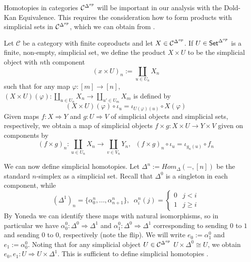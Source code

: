 Homotopies in categories $\mathcal{C}^{\Delta^{op}}$ will be important in our analysis with the Dold-Kan Equivalence. This requires the consideration how to form products with simplicial sets in $\mathcal{C}^{\Delta^{op}}$, which we can obtain from \cite[Defn 14.13.1]{StacksProject}.

\begin{defn}
    Let $\mathcal{C}$ be a category with finite coproducts and let $X \in \mathcal{C}^{\Delta^{op}}$. If $U \in \textup{\textsf{Set}}^{\Delta^{op}}$ is a finite, non-empty, simplicial set, we define the product $X \times U$ to be the simplicial object with $n$th component
    \begin{equation*}
        (x\times U)_n := \coprod_{u \in U_n}X_n
    \end{equation*}
    such that for any map $\varphi:[m]\rightarrow [n]$, $(X\times U)(\varphi):\coprod_{u \in U_n}X_n\rightarrow \coprod_{u' \in U_m}X_m$ is defined by
    \begin{equation*}
        (X\times U)(\varphi)\circ \iota_u = \iota_{U(\varphi)(u)}\circ X(\varphi)
    \end{equation*}
    Given maps $f:X\Rightarrow Y$ and $g:U\Rightarrow V$ of simplicial objects and simplicial sets, respectively, we obtain a map of simplicial objects $f\times g:X\times U\rightarrow Y\times V$ given on components by 
    \begin{equation*}
        (f\times g)_n : \coprod_{u \in U_n}X_n\rightarrow \coprod_{v \in V_n}Y_n,\;\; (f\times g)_n\circ \iota_u = \iota_{g_n(u)}\circ f_n
    \end{equation*}
\end{defn}

We can now define simplicial homotopies. Let $\Delta^n := Hom_{\Delta}(-,[n])$ be the standard $n$-simplex as a simplicial set. Recall that $\Delta^0$ is a singleton in each component, while 
\begin{equation*}
    (\Delta^1)_n = \{\alpha_0^n,...,\alpha_{n+1}^n\},\;\;\alpha_i^n(j) = \left\{\begin{array}{cc} 0 & j < i \\ 1 & j \geq i \end{array}\right.
\end{equation*}
By Yoneda we can identify these maps with natural isomorphisms, so in particular we have $\alpha_0^0:\Delta^0\Rightarrow \Delta^1$ and $\alpha_1^0:\Delta^0\Rightarrow \Delta^1$ corresponding to sending $0$ to $1$ and sending $0$ to $0$, respectively (note the flip). We will write $e_0 := \alpha_1^0$ and $e_1 := \alpha_0^0$. Noting that for any simplicial object $U \in \mathcal{C}^{\Delta^{op}}$ $U\times \Delta^0 \cong U$, we obtain $e_0,e_1:U\Rightarrow U\times \Delta^1$. This is sufficient to define simplicial homotopies \cite[Defn 14.26.1]{StacksProject}.

